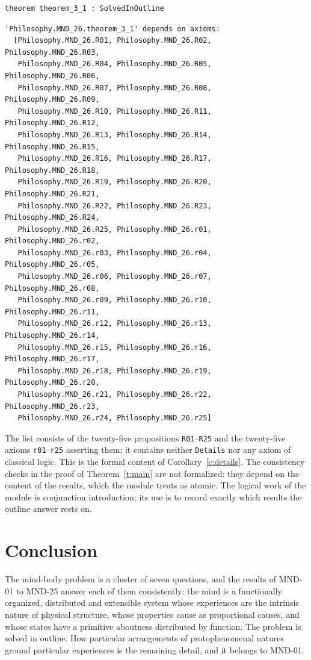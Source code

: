 \documentclass{situationist-preprint}
\begin{document}
\begin{lstlisting}
theorem theorem_3_1 : SolvedInOutline
\end{lstlisting}

\begin{lstlisting}
'Philosophy.MND_26.theorem_3_1' depends on axioms:
  [Philosophy.MND_26.R01, Philosophy.MND_26.R02, Philosophy.MND_26.R03,
   Philosophy.MND_26.R04, Philosophy.MND_26.R05, Philosophy.MND_26.R06,
   Philosophy.MND_26.R07, Philosophy.MND_26.R08, Philosophy.MND_26.R09,
   Philosophy.MND_26.R10, Philosophy.MND_26.R11, Philosophy.MND_26.R12,
   Philosophy.MND_26.R13, Philosophy.MND_26.R14, Philosophy.MND_26.R15,
   Philosophy.MND_26.R16, Philosophy.MND_26.R17, Philosophy.MND_26.R18,
   Philosophy.MND_26.R19, Philosophy.MND_26.R20, Philosophy.MND_26.R21,
   Philosophy.MND_26.R22, Philosophy.MND_26.R23, Philosophy.MND_26.R24,
   Philosophy.MND_26.R25, Philosophy.MND_26.r01, Philosophy.MND_26.r02,
   Philosophy.MND_26.r03, Philosophy.MND_26.r04, Philosophy.MND_26.r05,
   Philosophy.MND_26.r06, Philosophy.MND_26.r07, Philosophy.MND_26.r08,
   Philosophy.MND_26.r09, Philosophy.MND_26.r10, Philosophy.MND_26.r11,
   Philosophy.MND_26.r12, Philosophy.MND_26.r13, Philosophy.MND_26.r14,
   Philosophy.MND_26.r15, Philosophy.MND_26.r16, Philosophy.MND_26.r17,
   Philosophy.MND_26.r18, Philosophy.MND_26.r19, Philosophy.MND_26.r20,
   Philosophy.MND_26.r21, Philosophy.MND_26.r22, Philosophy.MND_26.r23,
   Philosophy.MND_26.r24, Philosophy.MND_26.r25]
\end{lstlisting}

The list consists of the twenty-five propositions \texttt{R01}--\texttt{R25} and the twenty-five axioms \texttt{r01}--\texttt{r25} asserting them; it contains neither \texttt{Details} nor any axiom of classical logic. This is the formal content of Corollary~\ref{c:details}. The consistency checks in the proof of Theorem~\ref{t:main} are not formalized: they depend on the content of the results, which the module treats as atomic. The logical work of the module is conjunction introduction; its use is to record exactly which results the outline answer rests on.

\section{Conclusion}

The mind-body problem is a cluster of seven questions, and the results of MND-01 to MND-25 answer each of them consistently: the mind is a functionally organized, distributed and extensible system whose experiences are the intrinsic nature of physical structure, whose properties cause as proportional causes, and whose states have a primitive aboutness distributed by function. The problem is solved in outline. How particular arrangements of protophenomenal natures ground particular experiences is the remaining detail, and it belongs to MND-01.
\end{document}
